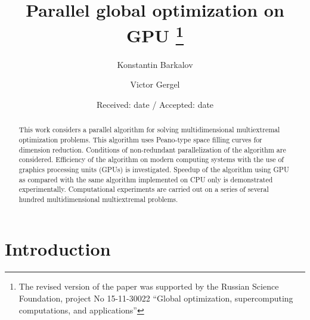 \documentclass[smallcondensed]{svjour3}     %
\begin{document}
\title{Parallel global optimization on GPU 
	\thanks{The revised version of the paper was supported by the Russian Science Foundation, project No 15-11-30022 ``Global optimization, supercomputing computations, and applications''}
}

\author{Konstantin Barkalov         \and
        Victor Gergel 
}



\date{Received: date / Accepted: date}


\maketitle

\begin{abstract}
This work considers a parallel algorithm for solving multidimensional multiextremal optimization problems. This algorithm uses Peano-type space filling curves for dimension reduction. Conditions of non-redundant parallelization of the algorithm are considered. Efficiency of the algorithm on modern computing systems with the use of graphics processing units (GPUs) is investigated. Speedup of the algorithm using GPU as compared with the same algorithm implemented on CPU only is demonstrated experimentally. Computational experiments are carried out on a series of several hundred multidimensional multiextremal problems.
\end{abstract}

\section{Introduction} \label{intro}
\end{document}
